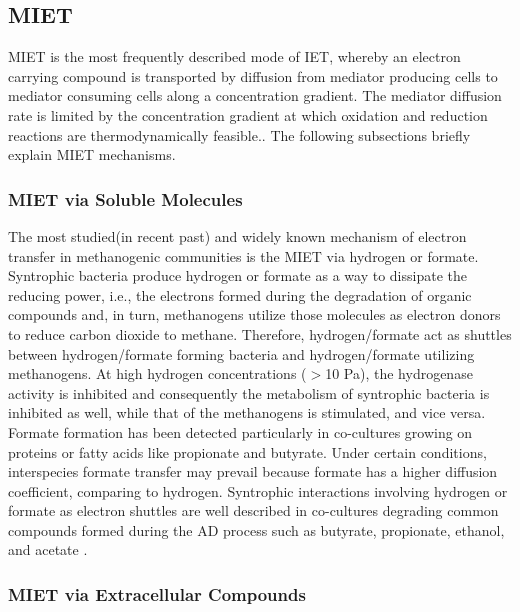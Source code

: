 \documentclass[fontsize=12pt,headsepline=true, bibliography=totocnumbered, twoside]{scrbook} %
\begin{document}
\subsection[Mediated interspecies electron transfer]{\acf{MIET}}

\acf{MIET} is the most frequently described mode of \ac{IET}, whereby an electron carrying compound is transported by diffusion from mediator producing cells to mediator consuming cells along a concentration gradient. The mediator diffusion rate is limited by the concentration gradient at which oxidation and reduction reactions are thermodynamically feasible.\citep{storck2016modelling}. The following subsections briefly explain \ac{MIET} mechanisms.


\subsubsection{\ac{MIET} via Soluble Molecules}

 The most studied(in recent past) and widely known mechanism of electron transfer in methanogenic 
communities is the \ac{MIET} via hydrogen or 
formate. Syntrophic bacteria produce hydrogen or formate as a way
 to dissipate the reducing power, i.e., the electrons formed during the
  degradation of organic compounds and, in turn, methanogens utilize 
  those molecules as electron donors to reduce carbon dioxide to methane.
   Therefore, hydrogen/formate act as shuttles between hydrogen/formate forming bacteria
    and hydrogen/formate utilizing methanogens. At high hydrogen concentrations ($>$10 Pa),
     the hydrogenase activity is inhibited and consequently the metabolism of syntrophic bacteria is
      inhibited as well, while that of the methanogens is stimulated, and vice versa. Formate
       formation has been detected particularly in co-cultures growing on proteins or fatty acids 
       like propionate and butyrate. Under certain conditions, interspecies formate transfer
        may prevail because formate has a higher diffusion coefficient, comparing to hydrogen.
        Syntrophic interactions involving hydrogen or formate as electron shuttles are well described
         in co-cultures degrading common compounds formed during the \ac{AD} process such as butyrate, propionate, ethanol, and acetate \citep{martins2018methane}.
 
 
\subsubsection{\ac{MIET} via Extracellular Compounds}
\end{document}
